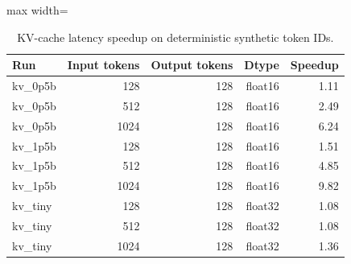 \begin{table}[t]
\centering
\caption{KV-cache latency speedup on deterministic synthetic token IDs.}
\label{tab:kv-results}
\begin{adjustbox}{max width=\columnwidth}
\begin{tabular}{lrrrr}
\toprule
Run & Input tokens & Output tokens & Dtype & Speedup \\
\midrule
kv\_0p5b & 128 & 128 & float16 & 1.11 \\
kv\_0p5b & 512 & 128 & float16 & 2.49 \\
kv\_0p5b & 1024 & 128 & float16 & 6.24 \\
kv\_1p5b & 128 & 128 & float16 & 1.51 \\
kv\_1p5b & 512 & 128 & float16 & 4.85 \\
kv\_1p5b & 1024 & 128 & float16 & 9.82 \\
kv\_tiny & 128 & 128 & float32 & 1.08 \\
kv\_tiny & 512 & 128 & float32 & 1.08 \\
kv\_tiny & 1024 & 128 & float32 & 1.36 \\
\bottomrule
\end{tabular}
\end{adjustbox}
\end{table}
